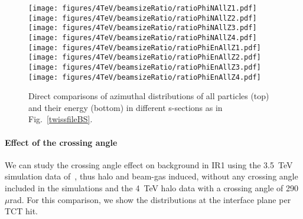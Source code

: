 
\begin{figure}%
\begin{center}
  \texttt{[image: figures/4TeV/beamsizeRatio/ratioPhiNAllZ1.pdf]}
  \texttt{[image: figures/4TeV/beamsizeRatio/ratioPhiNAllZ2.pdf]}
  \texttt{[image: figures/4TeV/beamsizeRatio/ratioPhiNAllZ3.pdf]}
  \texttt{[image: figures/4TeV/beamsizeRatio/ratioPhiNAllZ4.pdf]}
  \texttt{[image: figures/4TeV/beamsizeRatio/ratioPhiEnAllZ1.pdf]}
  \texttt{[image: figures/4TeV/beamsizeRatio/ratioPhiEnAllZ2.pdf]}
  \texttt{[image: figures/4TeV/beamsizeRatio/ratioPhiEnAllZ3.pdf]}
  \texttt{[image: figures/4TeV/beamsizeRatio/ratioPhiEnAllZ4.pdf]}
\end{center}
\vspace{-0.6cm}
 \caption{Direct comparisons of azimuthal distributions of all particles (top) and their energy (bottom) in different s-sections as in Fig.~\ref{twissfileBS}.
  \label{bsZAll}}
\end{figure}

 
\paragraph{Effect of the crossing angle}

We can study the crossing angle effect on background in IR1 using the 3.5~TeV simulation data of~\cite{nimPaperRod}, thus halo and beam-gas induced, without any crossing angle included in the simulations and the 4~TeV halo data with a crossing angle of 290~$\mu$rad. For this comparison, we show the distributions at the interface plane per TCT hit. 


